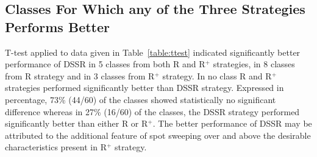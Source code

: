\subsection{Classes For Which any of the Three Strategies Performs Better}

T-test applied to data given in Table~\ref{table:ttest} indicated significantly better performance of DSSR in 5 classes from both R and R$^+$ strategies, in 8 classes from R strategy and in 3 classes from R$^+$ strategy. In no class R and R$^+$ strategies performed significantly better than DSSR strategy. Expressed in percentage, 73\% (44/60) of the classes showed statistically no significant difference whereas in 27\% (16/60) of the classes, the DSSR strategy performed significantly better than either R or R$^+$. The better performance of DSSR may be attributed to the additional feature of spot sweeping over and above the desirable characteristics present in R$^+$ strategy. 






